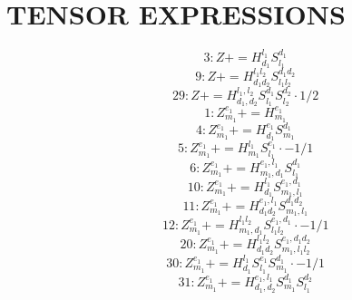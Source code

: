 \documentclass[letterpaper,10pt,fleqn,leqno,onecolumn]{article}
\begin{document}
\section{TENSOR EXPRESSIONS}
\begin{equation} \;\;\;\;\;\;  3: Z+=H^{l_{1}}_{d_{1}}S^{d_{1}}_{l_{1}} \end{equation}
\begin{equation} \;\;\;\;\;\;  9: Z+=H^{l_{1}l_{2}}_{d_{1}d_{2}}S^{d_{1}d_{2}}_{l_{1}l_{2}} \end{equation}
\begin{equation} \;\;\;\;\;\;  29: Z+=H^{l_{1},l_{2}}_{d_{1},d_{2}}S^{d_{1}}_{l_{1}}S^{d_{2}}_{l_{2}}\cdot 1/2 \end{equation}
\begin{equation} \;\;\;\;\;\;  1: Z^{e_{1}}_{m_{1}}+=H^{e_{1}}_{m_{1}} \end{equation}
\begin{equation} \;\;\;\;\;\;  4: Z^{e_{1}}_{m_{1}}+=H^{e_{1}}_{d_{1}}S^{d_{1}}_{m_{1}} \end{equation}
\begin{equation} \;\;\;\;\;\;  5: Z^{e_{1}}_{m_{1}}+=H^{l_{1}}_{m_{1}}S^{e_{1}}_{l_{1}}\cdot -1/1 \end{equation}
\begin{equation} \;\;\;\;\;\;  6: Z^{e_{1}}_{m_{1}}+=H^{e_{1},l_{1}}_{m_{1},d_{1}}S^{d_{1}}_{l_{1}} \end{equation}
\begin{equation} \;\;\;\;\;\;  10: Z^{e_{1}}_{m_{1}}+=H^{l_{1}}_{d_{1}}S^{e_{1},d_{1}}_{m_{1},l_{1}} \end{equation}
\begin{equation} \;\;\;\;\;\;  11: Z^{e_{1}}_{m_{1}}+=H^{e_{1},l_{1}}_{d_{1}d_{2}}S^{d_{1}d_{2}}_{m_{1},l_{1}} \end{equation}
\begin{equation} \;\;\;\;\;\;  12: Z^{e_{1}}_{m_{1}}+=H^{l_{1}l_{2}}_{m_{1},d_{1}}S^{e_{1},d_{1}}_{l_{1}l_{2}}\cdot -1/1 \end{equation}
\begin{equation} \;\;\;\;\;\;  20: Z^{e_{1}}_{m_{1}}+=H^{l_{1}l_{2}}_{d_{1}d_{2}}S^{e_{1},d_{1}d_{2}}_{m_{1},l_{1}l_{2}} \end{equation}
\begin{equation} \;\;\;\;\;\;  30: Z^{e_{1}}_{m_{1}}+=H^{l_{1}}_{d_{1}}S^{e_{1}}_{l_{1}}S^{d_{1}}_{m_{1}}\cdot -1/1 \end{equation}
\begin{equation} \;\;\;\;\;\;  31: Z^{e_{1}}_{m_{1}}+=H^{e_{1},l_{1}}_{d_{1},d_{2}}S^{d_{1}}_{m_{1}}S^{d_{2}}_{l_{1}} \end{equation}
\end{document}
